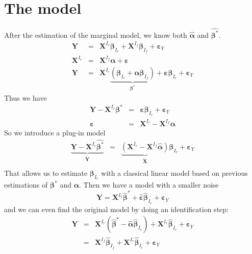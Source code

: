 \documentclass[12pt,a4paper]{report}
\begin{document}
	\section{The model}
		After the estimation of the marginal model, we know both $\hat{\boldsymbol{\alpha}}$ and $\hat{\boldsymbol{\beta}^*}$.
		\begin{eqnarray}
			\boldsymbol{Y}&=& \boldsymbol{X}^{I_r}\boldsymbol{\beta}_{I_r}+\boldsymbol{X}^{I_f}\boldsymbol{\beta}_{I_f}+\boldsymbol{\varepsilon}_Y \\
			\boldsymbol{X}^{I_r}&=&\boldsymbol{X}^{I_f}\boldsymbol{\alpha}+\boldsymbol{\varepsilon} \\
			\boldsymbol{Y}&=& \boldsymbol{X}^{I_r}\underbrace{(\boldsymbol{\beta}_{I_r}+\boldsymbol{\alpha}\boldsymbol{\beta}_{I_f})}_{\boldsymbol{\beta}^*}+\boldsymbol{\varepsilon}\boldsymbol{\beta}_{I_r}+\boldsymbol{\varepsilon}_Y 
					\end{eqnarray}		 
		Thus we have
		\begin{eqnarray}
			\boldsymbol{Y}- \boldsymbol{X}^{I_r}\boldsymbol{\beta}^*&=&\boldsymbol{\varepsilon}\boldsymbol{\beta}_{I_r}+\boldsymbol{\varepsilon}_Y \\
			\boldsymbol{\varepsilon}&=&\boldsymbol{X}^{I_r}-\boldsymbol{X}^{I_f}\boldsymbol{\alpha}
		\end{eqnarray}		 
		So we introduce a plug-in model
		\begin{eqnarray}
			\underbrace{\boldsymbol{Y}- \boldsymbol{X}^{I_r}\hat{\boldsymbol{\beta}^*}}_{\tilde{\boldsymbol{Y}}}&=&\underbrace{(\boldsymbol{X}^{I_r}-\boldsymbol{X}^{I_f}\hat{\boldsymbol{\alpha}})}_{\tilde{\boldsymbol{X}}}\boldsymbol{\beta}_{I_r}+\boldsymbol{\varepsilon}_Y \\
		\end{eqnarray}
		That allows us to estimate $\boldsymbol{\beta}_{I_r}$ with a classical linear model based on previous estimations of $\boldsymbol{\beta}^*$ and $\boldsymbol{\alpha}$.
		Then we have a model with a smaller noise
		\begin{equation}
			\boldsymbol{Y}= \boldsymbol{X}^{I_r}\hat{\boldsymbol{\beta}}^* + \hat{\boldsymbol{\varepsilon}}\hat{\boldsymbol{\beta}}_{I_r}+\boldsymbol{\varepsilon}_Y 
		\end{equation}
		and we can even find the original model by doing an identification step:
		\begin{eqnarray}
			\boldsymbol{Y}&=& \boldsymbol{X}^{I_r}(\hat{\boldsymbol{\beta}}^*-\hat{\boldsymbol{\alpha}}\hat{\boldsymbol{\beta}}_{I_r}) + \boldsymbol{X}^{I_r}\hat{\boldsymbol{\beta}}_{I_r}+\boldsymbol{\varepsilon}_Y \\
			&=&\boldsymbol{X}^{I_f}\hat{\boldsymbol{\beta}}_{I_f}+\boldsymbol{X}^{I_r}\hat{\boldsymbol{\beta}}_{I_r}+\boldsymbol{\varepsilon}_Y
		\end{eqnarray}
	
\end{document}
